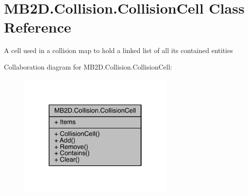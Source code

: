 \hypertarget{class_m_b2_d_1_1_collision_1_1_collision_cell}{}\section{M\+B2\+D.\+Collision.\+Collision\+Cell Class Reference}
\label{class_m_b2_d_1_1_collision_1_1_collision_cell}


A cell used in a collision map to hold a linked list of all its contained entities  




Collaboration diagram for M\+B2\+D.\+Collision.\+Collision\+Cell\+:
\nopagebreak
\begin{figure}[H]
\begin{center}
\leavevmode
\includegraphics[width=222pt]{class_m_b2_d_1_1_collision_1_1_collision_cell__coll__graph}
\end{center}
\end{figure}
